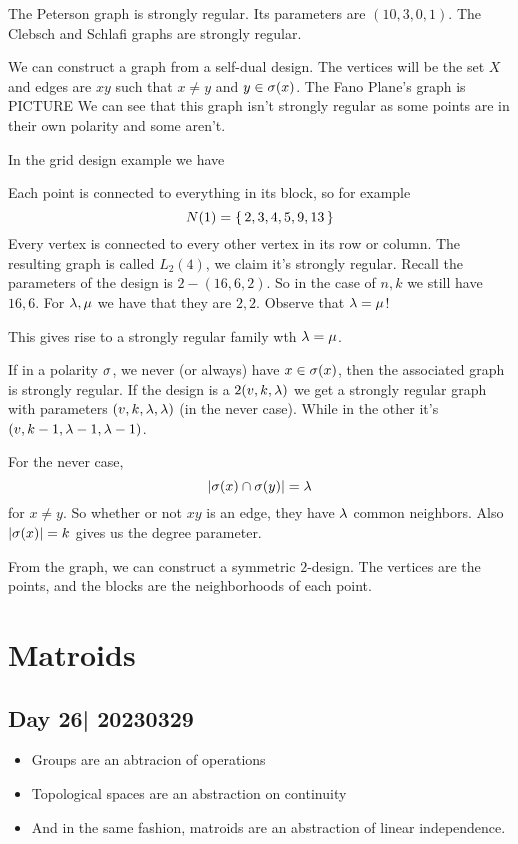 \documentclass[12pt]{memoir}
\begin{document}
\begin{Ex}
    The Peterson graph is strongly regular. Its parameters are $(10,3,0,1)$. The Clebsch and Schlafi graphs are strongly regular.
\end{Ex}

We can construct a graph from a self-dual design. The vertices will be the set $X$ and edges are $xy$ such that $x\neq y$ and $y\in\sigma(x)$. The Fano Plane's graph is PICTURE 
We can see that this graph isn't strongly regular as some points are in their own polarity and some aren't.

\begin{Ex}
    In the grid design example we have \par 
    Each point is connected to everything in its block, so for example 
    $$N(1)=\{\,2,3,4,5,9,13\,\}$$
    Every vertex is connected to every other vertex in its row or column. The resulting graph is called $L_2(4)$, we claim it's strongly regular. Recall the parameters of the design is $2-(16,6,2)$. So in the case of $n,k$ we still have $16,6$. For $\lambda,\mu$ we have that they are $2,2$. Observe that $\lambda=\mu$!
\end{Ex}
This gives rise to a strongly regular family wth $\lambda=\mu$.
\begin{Lem}
    If in a polarity $\sigma$, we never (or always) have $x\in\sigma(x)$, then the associated graph is strongly regular. If the design is a $2(v,k,\lambda)$ we get a strongly regular graph with parameters $(v,k,\lambda,\lambda)$ (in the never case). While in the other it's $(v,k-1,\lambda-1,\lambda-1)$.
\end{Lem}

\begin{ptcbp}
    For the never case, 
    $$|\sigma(x)\cap\sigma(y)|=\lambda$$
    for $x\neq y$. So whether or not $xy$ is an edge, they have $\lambda$ common neighbors. Also $|\sigma(x)|=k$ gives us the degree parameter.\par 
    From the graph, we can construct a symmetric $2$-design. The vertices are the points, and the blocks are the neighborhoods of each point.
\end{ptcbp}
\chapter{Matroids}
\section{Day 26| 20230329}
\begin{itemize}
    \item Groups are an abtracion of operations
    \item Topological spaces are an abstraction on continuity 
    \item And in the same fashion, matroids are an abstraction of linear independence.
\end{itemize}
\end{document}
